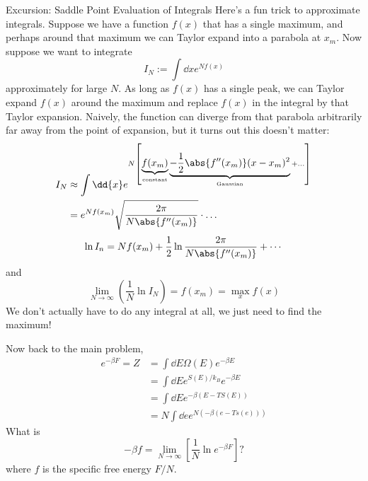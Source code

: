 \documentclass[a4paper,twoside,master.tex]{subfiles}
\begin{document}
\begin{note}{Excursion: Saddle Point Evaluation of Integrals}
    Here's a fun trick to approximate integrals. Suppose we have a function $ f(x) $ that has a single maximum, and perhaps around that maximum we can Taylor expand into a parabola at $ x_m $. Now suppose we want to integrate
    \begin{equation}
        I_N := \int \dd{x} e^{N f(x)}
    \end{equation}
    approximately for large $ N $. As long as $ f(x) $ has a single peak, we can Taylor expand $ f(x) $ around the maximum and replace $ f(x) $ in the integral by that Taylor expansion. Naively, the function can diverge from that parabola arbitrarily far away from the point of expansion, but it turns out this doesn't matter:
    \begin{align}
        I_N &\approx \int \dd{x} e^{N \left[ \underbrace{f(x_m)}_{\text{constant}} \underbrace{- \frac{1}{2} \abs{f''(x_m)} (x - x_m)^2}_{\text{Gaussian}} + \ldots \right]} \\
        &= e^{N f(x_m)} \sqrt{\frac{2 \pi}{N \abs{f''(x_m)}}} \cdot \ldots
    \end{align}
    \begin{equation}
        \ln I_n = N f(x_m) + \frac{1}{2} \ln \frac{2 \pi}{N \abs{f''(x_m)}} + \cdots
    \end{equation}
    and
    \begin{equation}
        \lim_{N \to \infty} \left( \frac{1}{N} \ln I_N \right) = f(x_m) = \max_x f(x)
    \end{equation}
    We don't actually have to do any integral at all, we just need to find the maximum!
\end{note}

Now back to the main problem,
\begin{align}
    e^{- \beta F} = Z &= \int \dd{E} \Omega(E) e^{- \beta E} \\
    &= \int \dd{E} e^{S(E) / k_B} e^{- \beta E} \\
    &= \int \dd{E} e^{- \beta (E - TS(E))} \\
    &= N \int \dd{e} e^{N(- \beta (e - T s(e)))}
\end{align}
What is
\begin{equation}
    - \beta f = \lim_{N \to \infty} \left[ \frac{1}{N} \ln e^{- \beta F} \right]?
\end{equation}
where $ f $ is the specific free energy $ F/N $.
\end{document}
